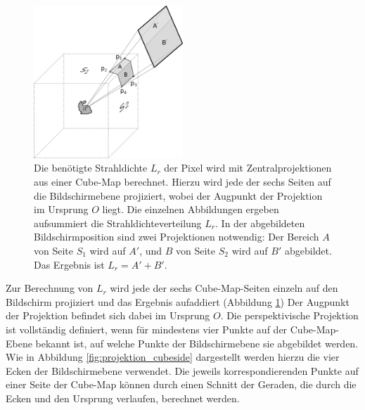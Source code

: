     
      \begin{figure}[H]
    \centering
    \includegraphics[width=0.5\textwidth]{../graphics/beleuchtung/projektion_grey.png}
    \caption[Projektion von Cube-Map auf Bildschirmebene]{Die benötigte Strahldichte $L_r$ der Pixel wird mit Zentralprojektionen aus einer Cube-Map berechnet. Hierzu wird jede der sechs Seiten auf die Bildschirmebene projiziert, wobei der Augpunkt der Projektion im Ursprung $O$ liegt. 
    Die einzelnen Abbildungen ergeben aufsummiert die Strahldichteverteilung $L_r$.
    In der abgebildeten Bildschirmposition sind zwei Projektionen notwendig: Der Bereich $A$ von Seite $S_1$ wird auf $A'$, und $B$ von Seite $S_2$ wird auf $B'$ abgebildet. Das Ergebnis ist $L_r=A'+B'$.
    }
    \label{fig:projektion}
   \end{figure}
   
   Zur Berechnung von $L_r$ wird jede der sechs Cube-Map-Seiten einzeln auf den Bildschirm projiziert und das Ergebnis aufaddiert (Abbildung \ref{fig:projektion})  
   Der Augpunkt der Projektion befindet sich dabei im Ursprung $O$.
   Die perspektivische Projektion ist vollständig definiert, wenn für mindestens vier Punkte auf der Cube-Map-Ebene bekannt ist, auf welche Punkte der Bildschirmebene sie abgebildet werden.
   Wie in Abbildung \ref{fig:projektion_cubeside} dargestellt werden hierzu die vier Ecken der Bildschirmebene verwendet.
   Die jeweils korrespondierenden Punkte auf einer Seite der Cube-Map können durch einen Schnitt der Geraden, die durch die Ecken und den Ursprung verlaufen, berechnet werden.
   

